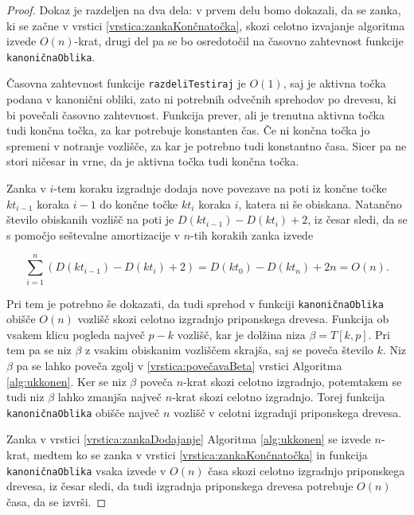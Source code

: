\begin{proof}

Dokaz je razdeljen na dva dela: v prvem delu bomo dokazali, da se zanka, ki se začne v vrstici \ref{vrstica:zankaKončnatočka}, skozi celotno izvajanje algoritma izvede $O(n)$-krat, drugi del pa se bo osredotočil na časovno zahtevnost funkcije \texttt{kanoničnaOblika}. 

Časovna zahtevnost funkcije \texttt{razdeliTestiraj} je $O(1)$, saj je aktivna točka podana v kanonični obliki, zato ni potrebnih odvečnih sprehodov po drevesu, ki bi povečali časovno zahtevnost. Funkcija prever, ali je trenutna aktivna točka tudi končna točka, za kar potrebuje konstanten čas. Če ni končna točka jo spremeni v notranje vozlišče, za kar je potrebno tudi konstantno časa. Sicer pa ne stori ničesar in vrne, da je aktivna točka tudi končna točka.

Zanka v $i$-tem koraku izgradnje dodaja nove povezave na poti iz končne točke $kt_{i-1}$ koraka $i-1$ do končne točke $kt_i$ koraka $i$, katera ni še obiskana. Natančno število obiskanih vozlišč na poti je $D(kt_{i-1})-D(kt_i)+2$, iz česar sledi, da se s pomočjo seštevalne amortizacije v $n$-tih korakih zanka izvede


$$
    \sum_{i=1}^n \left(D(kt_{i-1})-D(kt_i)+2\right)=D(kt_0)-D(kt_n)+2n=O(n).
$$

Pri tem je potrebno še dokazati, da tudi sprehod v funkciji \texttt{kanoničnaOblika} obišče $O(n)$ vozlišč skozi celotno izgradnjo priponskega drevesa. Funkcija ob vsakem klicu pogleda največ $p-k$ vozlišč, kar je dolžina niza $\beta=T[k,p]$. Pri tem pa se niz $\beta$ z vsakim obiskanim vozliščem skrajša, saj se poveča število $k$. Niz $\beta$ pa se lahko poveča zgolj v \ref{vrstica:povečavaBeta} vrstici Algoritma \ref{alg:ukkonen}. Ker se niz $\beta$ poveča $n$-krat skozi celotno izgradnjo, potemtakem se tudi niz $\beta$ lahko zmanjša največ $n$-krat skozi celotno izgradnjo. Torej funkcija \texttt{kanoničnaOblika} obišče največ $n$ vozlišč v celotni izgradnji priponskega drevesa.


Zanka v vrstici \ref{vrstica:zankaDodajanje} Algoritma \ref{alg:ukkonen} se izvede $n$-krat, medtem ko se zanka v vrstici \ref{vrstica:zankaKončnatočka} in funkcija \texttt{kanoničnaOblika} vsaka izvede v $O(n)$ časa skozi celotno izgradnjo priponskega drevesa, iz česar sledi, da tudi izgradnja priponskega drevesa potrebuje $O(n)$ časa, da se izvrši.
  
\end{proof}


